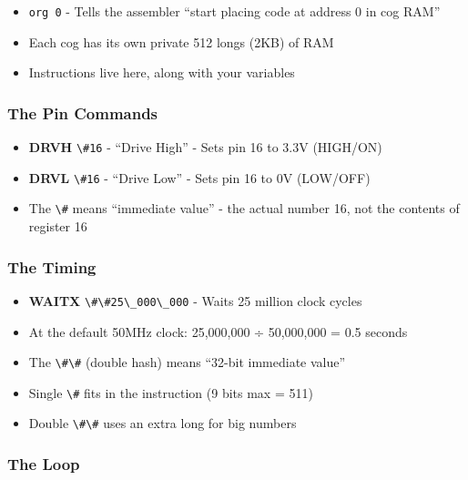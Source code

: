 \documentclass[11pt]{book}
\providecommand{\tightlist}{%
  \setlength{\itemsep}{0pt}\setlength{\parskip}{0pt}}
\newcommand{\passthrough}[1]{#1}
\begin{document}
\begin{itemize}
\tightlist
\item
  \passthrough{\lstinline!org 0!} - Tells the assembler ``start placing
  code at address 0 in cog RAM''
\item
  Each cog has its own private 512 longs (2KB) of RAM
\item
  Instructions live here, along with your variables
\end{itemize}

\hypertarget{the-pin-commands}{%
\subsubsection{The Pin Commands}\label{the-pin-commands}}

\begin{itemize}
\tightlist
\item
  \textbf{DRVH} \passthrough{\lstinline!\#16!} - ``Drive High'' - Sets
  pin 16 to 3.3V (HIGH/ON)
\item
  \textbf{DRVL} \passthrough{\lstinline!\#16!} - ``Drive Low'' - Sets
  pin 16 to 0V (LOW/OFF)
\item
  The \passthrough{\lstinline!\#!} means ``immediate value'' - the
  actual number 16, not the contents of register 16
\end{itemize}

\hypertarget{the-timing}{%
\subsubsection{The Timing}\label{the-timing}}

\begin{itemize}
\tightlist
\item
  \textbf{WAITX} \passthrough{\lstinline!\#\#25\_000\_000!} - Waits 25
  million clock cycles
\item
  At the default 50MHz clock: 25,000,000 ÷ 50,000,000 = 0.5 seconds
\item
  The \passthrough{\lstinline!\#\#!} (double hash) means ``32-bit
  immediate value''
\item
  Single \passthrough{\lstinline!\#!} fits in the instruction (9 bits
  max = 511)
\item
  Double \passthrough{\lstinline!\#\#!} uses an extra long for big
  numbers
\end{itemize}

\hypertarget{the-loop}{%
\subsubsection{The Loop}\label{the-loop}}
\end{document}
